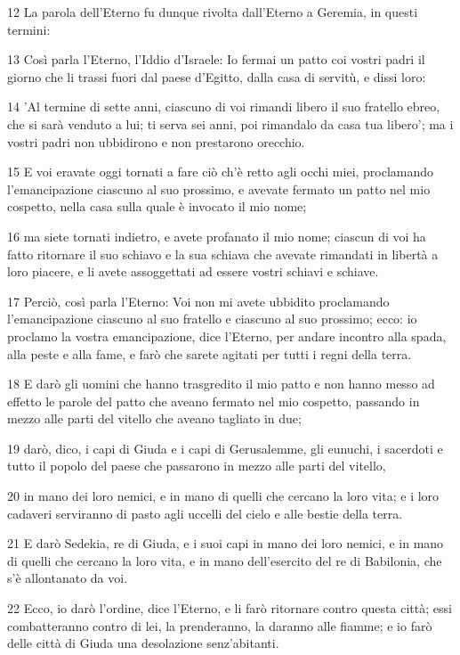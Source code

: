 \par 12 La parola dell'Eterno fu dunque rivolta dall'Eterno a Geremia, in questi termini:
\par 13 Così parla l'Eterno, l'Iddio d'Israele: Io fermai un patto coi vostri padri il giorno che li trassi fuori dal paese d'Egitto, dalla casa di servitù, e dissi loro:
\par 14 'Al termine di sette anni, ciascuno di voi rimandi libero il suo fratello ebreo, che si sarà venduto a lui; ti serva sei anni, poi rimandalo da casa tua libero'; ma i vostri padri non ubbidirono e non prestarono orecchio.
\par 15 E voi eravate oggi tornati a fare ciò ch'è retto agli occhi miei, proclamando l'emancipazione ciascuno al suo prossimo, e avevate fermato un patto nel mio cospetto, nella casa sulla quale è invocato il mio nome;
\par 16 ma siete tornati indietro, e avete profanato il mio nome; ciascun di voi ha fatto ritornare il suo schiavo e la sua schiava che avevate rimandati in libertà a loro piacere, e li avete assoggettati ad essere vostri schiavi e schiave.
\par 17 Perciò, così parla l'Eterno: Voi non mi avete ubbidito proclamando l'emancipazione ciascuno al suo fratello e ciascuno al suo prossimo; ecco: io proclamo la vostra emancipazione, dice l'Eterno, per andare incontro alla spada, alla peste e alla fame, e farò che sarete agitati per tutti i regni della terra.
\par 18 E darò gli uomini che hanno trasgredito il mio patto e non hanno messo ad effetto le parole del patto che aveano fermato nel mio cospetto, passando in mezzo alle parti del vitello che aveano tagliato in due;
\par 19 darò, dico, i capi di Giuda e i capi di Gerusalemme, gli eunuchi, i sacerdoti e tutto il popolo del paese che passarono in mezzo alle parti del vitello,
\par 20 in mano dei loro nemici, e in mano di quelli che cercano la loro vita; e i loro cadaveri serviranno di pasto agli uccelli del cielo e alle bestie della terra.
\par 21 E darò Sedekia, re di Giuda, e i suoi capi in mano dei loro nemici, e in mano di quelli che cercano la loro vita, e in mano dell'esercito del re di Babilonia, che s'è allontanato da voi.
\par 22 Ecco, io darò l'ordine, dice l'Eterno, e li farò ritornare contro questa città; essi combatteranno contro di lei, la prenderanno, la daranno alle fiamme; e io farò delle città di Giuda una desolazione senz'abitanti.

